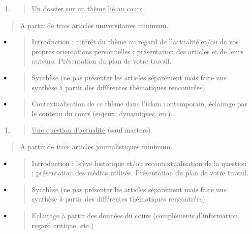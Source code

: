 \begin{enumerate}
\def\labelenumi{\alph{enumi}.}
\item
  \begin{quote}
  \underline{Un dossier sur un thème lié au cours}
  \end{quote}
\end{enumerate}

\begin{quote}
A partir de trois articles universitaires minimum.
\end{quote}

\begin{itemize}
\item
  \begin{quote}
  Introduction : intérêt du thème au regard de l'actualité et/ou de vos
  propres orientations personnelles ; présentation des articles et de
  leurs auteurs. Présentation du plan de votre travail.
  \end{quote}
\item
  \begin{quote}
  Synthèse (ne pas présenter les articles séparément mais faire une
  synthèse à partir des différentes thématiques rencontrées)
  \end{quote}
\item
  \begin{quote}
  Contextualisation de ce thème dans l'islam contemporain, éclairage par
  le contenu du cours (enjeux, dynamiques, etc).
  \end{quote}
\end{itemize}

\begin{enumerate}
\def\labelenumi{\alph{enumi}.}
\setcounter{enumi}{1}
\item
  \begin{quote}
  \underline{Une question d'actualité} (sauf masters)
  \end{quote}
\end{enumerate}

\begin{quote}
A partir de trois articles journalistiques minimum.
\end{quote}

\begin{itemize}
\item
  \begin{quote}
  Introduction : brève historique et/ou recontextualisation de la
  question ; présentation des médias utilisés. Présentation du plan de
  votre travail.
  \end{quote}
\item
  \begin{quote}
  Synthèse (ne pas présenter les articles séparément mais faire une
  synthèse à partir des différentes thématiques rencontrées).
  \end{quote}
\item
  \begin{quote}
  Eclairage à partir des données du cours (compléments d'information,
  regard critique, etc.)
  \end{quote}
\end{itemize}

